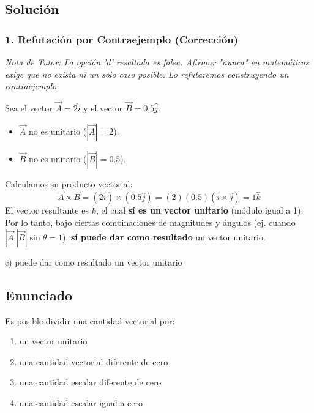 \documentclass[12pt, a4paper]{article}
\begin{document}
\subsection*{Solución}

\subsubsection*{1. Refutación por Contraejemplo (Corrección)}
\textit{Nota de Tutor: La opción 'd' resaltada es falsa. Afirmar "nunca" en matemáticas exige que no exista ni un solo caso posible. Lo refutaremos construyendo un contraejemplo.}

Sea el vector $\vec{A} = 2\hat{i}$ y el vector $\vec{B} = 0.5\hat{j}$.
\begin{itemize}
    \item $\vec{A}$ no es unitario ($|\vec{A}| = 2$).
    \item $\vec{B}$ no es unitario ($|\vec{B}| = 0.5$).
\end{itemize}
Calculamos su producto vectorial:
$$ \vec{A} \times \vec{B} = (2\hat{i}) \times (0.5\hat{j}) = (2)(0.5) (\hat{i} \times \hat{j}) = 1\hat{k} $$
El vector resultante es $\hat{k}$, el cual \textbf{sí es un vector unitario} (módulo igual a 1). 
Por lo tanto, bajo ciertas combinaciones de magnitudes y ángulos (ej. cuando $|\vec{A}||\vec{B}|\sin\theta = 1$), \textbf{sí puede dar como resultado} un vector unitario.

\begin{tcolorbox}[colback=green!5!white, colframe=green!50!black, title=Respuesta Final]
\centering \Large c) puede dar como resultado un vector unitario
\end{tcolorbox}

\newpage


\subsection*{Enunciado}
Es posible dividir una cantidad vectorial por:
\begin{enumerate}[label=\alph*)]
    \item un vector unitario
    \item una cantidad vectorial diferente de cero
    \item una cantidad escalar diferente de cero
    \item una cantidad escalar igual a cero
\end{enumerate}
\end{document}
